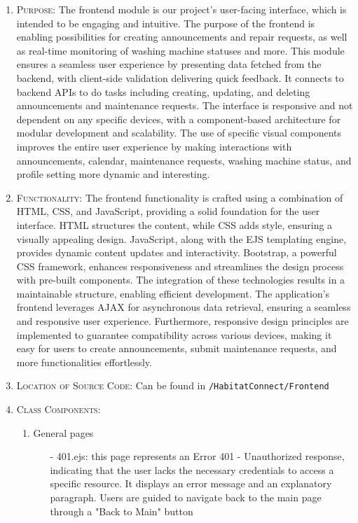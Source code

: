 \documentclass[conference]{IEEEtran}
\begin{document}
\begin{enumerate}
    \item \textsc{Purpose:} The frontend module is our project's user-facing interface, which is intended to be engaging and intuitive. The purpose of the frontend is enabling possibilities for creating announcements and repair requests, as well as real-time monitoring of washing machine statuses and more. This module ensures a seamless user experience by presenting data fetched from the backend, with client-side validation delivering quick feedback. It connects to backend APIs to do tasks including creating, updating, and deleting announcements and maintenance requests. The interface is responsive and not dependent on any specific devices, with a component-based architecture for modular development and scalability. The use of specific visual components improves the entire user experience by making interactions with announcements, calendar, maintenance requests, washing machine status, and profile setting more dynamic and interesting.
    \item \textsc{Functionality:} The frontend functionality is crafted using a combination of HTML, CSS, and JavaScript, providing a solid foundation for the user interface. HTML structures the content, while CSS adds style, ensuring a visually appealing design. JavaScript, along with the EJS templating engine, provides dynamic content updates and interactivity. Bootstrap, a powerful CSS framework, enhances responsiveness and streamlines the design process with pre-built components. The integration of these technologies results in a maintainable structure, enabling efficient development. The application's frontend leverages AJAX for asynchronous data retrieval, ensuring a seamless and responsive user experience. Furthermore, responsive design principles are implemented to guarantee compatibility across various devices, making it easy for users to create announcements, submit maintenance requests, and more functionalities effortlessly.
    \item \textsc{Location of Source Code:} Can be found in \texttt{/HabitatConnect/Frontend}
    \item \textsc{Class Components:}
        \begin{enumerate}
            \item General pages
                \begin{itemize}
                    \item[-] 401.ejs: this page represents an Error 401 - Unauthorized response, indicating that the user lacks the necessary credentials to access a specific resource. It displays an error message and an explanatory paragraph. Users are guided to navigate back to the main page through a "Back to Main" button

\end{itemize}
\end{enumerate}
\end{enumerate}
\end{document}

